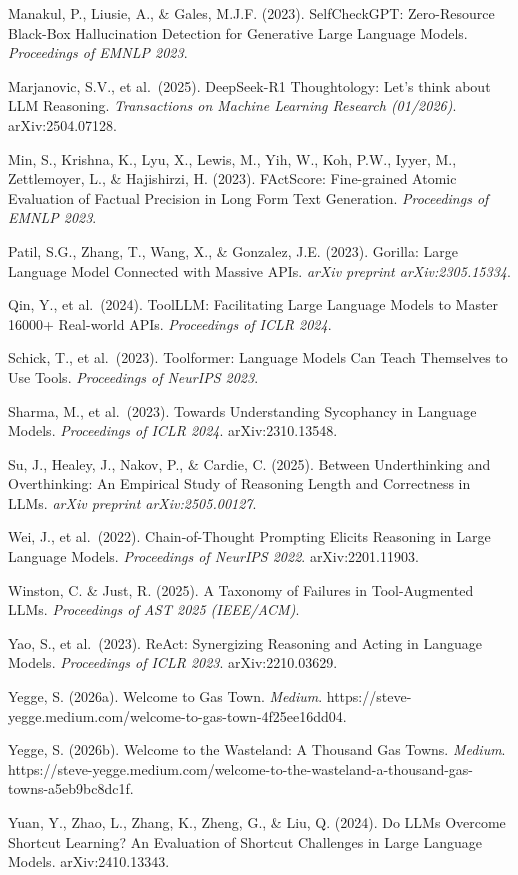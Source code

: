 \documentclass[
]{article}
\begin{document}
Manakul, P., Liusie, A., \& Gales, M.J.F. (2023). SelfCheckGPT:
Zero-Resource Black-Box Hallucination Detection for Generative Large
Language Models. \emph{Proceedings of EMNLP 2023}.

Marjanovic, S.V., et al.~(2025). DeepSeek-R1 Thoughtology: Let's think
about LLM Reasoning. \emph{Transactions on Machine Learning Research
(01/2026)}. arXiv:2504.07128.

Min, S., Krishna, K., Lyu, X., Lewis, M., Yih, W., Koh, P.W., Iyyer, M.,
Zettlemoyer, L., \& Hajishirzi, H. (2023). FActScore: Fine-grained
Atomic Evaluation of Factual Precision in Long Form Text Generation.
\emph{Proceedings of EMNLP 2023}.

Patil, S.G., Zhang, T., Wang, X., \& Gonzalez, J.E. (2023). Gorilla:
Large Language Model Connected with Massive APIs. \emph{arXiv preprint
arXiv:2305.15334}.

Qin, Y., et al.~(2024). ToolLLM: Facilitating Large Language Models to
Master 16000+ Real-world APIs. \emph{Proceedings of ICLR 2024}.

Schick, T., et al.~(2023). Toolformer: Language Models Can Teach
Themselves to Use Tools. \emph{Proceedings of NeurIPS 2023}.

Sharma, M., et al.~(2023). Towards Understanding Sycophancy in Language
Models. \emph{Proceedings of ICLR 2024}. arXiv:2310.13548.

Su, J., Healey, J., Nakov, P., \& Cardie, C. (2025). Between
Underthinking and Overthinking: An Empirical Study of Reasoning Length
and Correctness in LLMs. \emph{arXiv preprint arXiv:2505.00127}.

Wei, J., et al.~(2022). Chain-of-Thought Prompting Elicits Reasoning in
Large Language Models. \emph{Proceedings of NeurIPS 2022}.
arXiv:2201.11903.

Winston, C. \& Just, R. (2025). A Taxonomy of Failures in Tool-Augmented
LLMs. \emph{Proceedings of AST 2025 (IEEE/ACM)}.

Yao, S., et al.~(2023). ReAct: Synergizing Reasoning and Acting in
Language Models. \emph{Proceedings of ICLR 2023}. arXiv:2210.03629.

Yegge, S. (2026a). Welcome to Gas Town. \emph{Medium}.
https://steve-yegge.medium.com/welcome-to-gas-town-4f25ee16dd04.

Yegge, S. (2026b). Welcome to the Wasteland: A Thousand Gas Towns.
\emph{Medium}.
https://steve-yegge.medium.com/welcome-to-the-wasteland-a-thousand-gas-towns-a5eb9bc8dc1f.

Yuan, Y., Zhao, L., Zhang, K., Zheng, G., \& Liu, Q. (2024). Do LLMs
Overcome Shortcut Learning? An Evaluation of Shortcut Challenges in
Large Language Models. arXiv:2410.13343.
\end{document}
